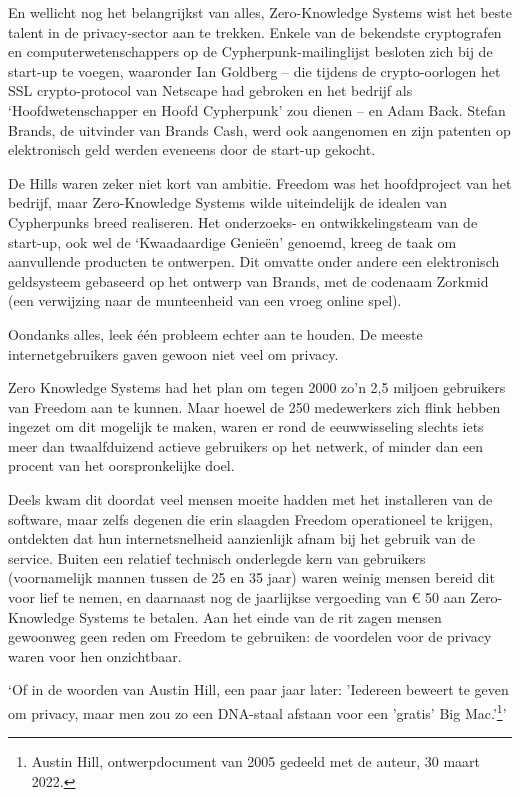 \documentclass[smalldemyvopaper,11pt,twoside,onecolumn,openright,extrafontsizes,hidelinks]{memoir}
\begin{document}
En wellicht nog het belangrijkst van alles, Zero-Knowledge Systems wist
het beste talent in de privacy-sector aan te trekken. Enkele van de
bekendste cryptografen en computerwetenschappers op de
Cypherpunk-mailinglijst besloten zich bij de start-up te voegen,
waaronder Ian Goldberg -- die tijdens de crypto-oorlogen het SSL
crypto-protocol van Netscape had gebroken en het bedrijf als
`Hoofdwetenschapper en Hoofd Cypherpunk' zou dienen -- en Adam Back.
Stefan Brands, de uitvinder van Brands Cash, werd ook aangenomen en zijn
patenten op elektronisch geld werden eveneens door de start-up gekocht.

De Hills waren zeker niet kort van ambitie. Freedom was het hoofdproject
van het bedrijf, maar Zero-Knowledge Systems wilde uiteindelijk de
idealen van Cypherpunks breed realiseren. Het onderzoeks- en
ontwikkelingsteam van de start-up, ook wel de `Kwaadaardige Genieën'
genoemd, kreeg de taak om aanvullende producten te ontwerpen. Dit
omvatte onder andere een elektronisch geldsysteem gebaseerd op het
ontwerp van Brands, met de codenaam Zorkmid (een verwijzing naar de
munteenheid van een vroeg online spel).

Oondanks alles, leek één probleem echter aan te houden. De meeste
internetgebruikers gaven gewoon niet veel om privacy.

Zero Knowledge Systems had het plan om tegen 2000 zo'n 2,5 miljoen
gebruikers van Freedom aan te kunnen. Maar hoewel de 250 medewerkers
zich flink hebben ingezet om dit mogelijk te maken, waren er rond de
eeuwwisseling slechts iets meer dan twaalfduizend actieve gebruikers op
het netwerk, of minder dan een procent van het oorspronkelijke doel.

Deels kwam dit doordat veel mensen moeite hadden met het installeren van
de software, maar zelfs degenen die erin slaagden Freedom operationeel
te krijgen, ontdekten dat hun internetsnelheid aanzienlijk afnam bij het
gebruik van de service. Buiten een relatief technisch onderlegde kern
van gebruikers (voornamelijk mannen tussen de 25 en 35 jaar) waren
weinig mensen bereid dit voor lief te nemen, en daarnaast nog de
jaarlijkse vergoeding van € 50 aan Zero-Knowledge Systems te betalen.
Aan het einde van de rit zagen mensen gewoonweg geen reden om Freedom te
gebruiken: de voordelen voor de privacy waren voor hen onzichtbaar.

`Of in de woorden van Austin Hill, een paar jaar later: 'Iedereen
beweert te geven om privacy, maar men zou zo een DNA-staal afstaan voor
een 'gratis' Big Mac.'\footnote{Austin Hill, ontwerpdocument van 2005
  gedeeld met de auteur, 30 maart 2022.}'
\end{document}
